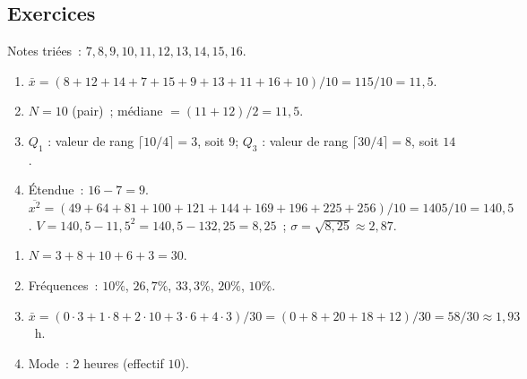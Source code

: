 \newcommand{\boitestat}[6]{%
\begin{tikzpicture}
\begin{axis}[width=9cm,height=2.5cm,xmin=#1,xmax=#5,enlarge x limits=0.12,
 ymin=-1,ymax=1,axis x line=bottom,axis y line=none,ytick=\empty,
 xtick={#1,#2,#3,#4,#5},scaled x ticks=false,tick label style={font=\scriptsize,/pgf/number format/fixed,/pgf/number format/precision=3},
 title={#6},title style={font=\small},boitecompare]
\draw[BN,thick] (axis cs:#1,0)--(axis cs:#2,0)
 (axis cs:#4,0)--(axis cs:#5,0)
 (axis cs:#1,-0.25)--(axis cs:#1,0.25)
 (axis cs:#5,-0.25)--(axis cs:#5,0.25);
\draw[BN,thick,fill=TQ!15] (axis cs:#2,-0.5) rectangle (axis cs:#4,0.5);
\draw[OR,thick] (axis cs:#3,-0.5)--(axis cs:#3,0.5);
\end{axis}
\end{tikzpicture}}

\subsection*{Exercices}


Notes tri\'ees~: $7,8,9,10,11,12,13,14,15,16$.
\begin{enumerate}
  \item $\bar{x}=(8+12+14+7+15+9+13+11+16+10)/10=115/10=11{,}5$.
  \item $N=10$ (pair)~; m\'ediane $=(11+12)/2=11{,}5$.
  \item $Q_1$ : valeur de rang $\lceil10/4\rceil=3$, soit $9$;
        $Q_3$ : valeur de rang $\lceil30/4\rceil=8$, soit $14$.
  \item \'Etendue~: $16-7=9$.
        $\overline{x^2}=(49+64+81+100+121+144+169+196+225+256)/10=1405/10=140{,}5$.
        $V=140{,}5-11{,}5^2=140{,}5-132{,}25=8{,}25$~; $\sigma=\sqrt{8{,}25}\approx2{,}87$.
\end{enumerate}


\begin{enumerate}
  \item $N=3+8+10+6+3=30$.
  \item Fr\'equences~: $10\%$, $26{,}7\%$, $33{,}3\%$, $20\%$, $10\%$.
  \item $\bar{x}=(0\cdot3+1\cdot8+2\cdot10+3\cdot6+4\cdot3)/30=(0+8+20+18+12)/30=58/30\approx1{,}93$~h.
  \item Mode~: $2$ heures (effectif $10$).
\end{enumerate}

